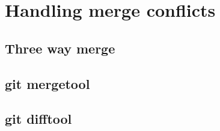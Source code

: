 \section{Handling merge conflicts}
\begin{frame}[fragile]
    \slidetitle
\end{frame}

\subsection{Three way merge}
\begin{frame}[fragile]
    \subslidetitle
\end{frame}

\subsection{git mergetool}
\begin{frame}[fragile]
    \subslidetitle
\end{frame}

\subsection{git difftool}
\begin{frame}[fragile]
    \subslidetitle
\end{frame}

